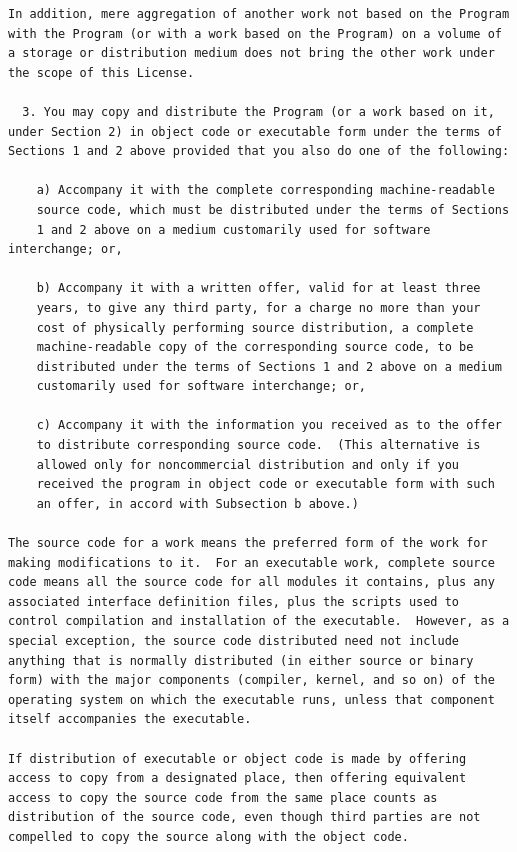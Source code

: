 \documentclass[a4paper,BCOR30mm,DIV14,pdftex,liststotoc,footsepline,openany]{scrbook}
\begin{document}
\begin{verbatim}
In addition, mere aggregation of another work not based on the Program
with the Program (or with a work based on the Program) on a volume of
a storage or distribution medium does not bring the other work under
the scope of this License.

  3. You may copy and distribute the Program (or a work based on it,
under Section 2) in object code or executable form under the terms of
Sections 1 and 2 above provided that you also do one of the following:

    a) Accompany it with the complete corresponding machine-readable
    source code, which must be distributed under the terms of Sections
    1 and 2 above on a medium customarily used for software interchange; or,

    b) Accompany it with a written offer, valid for at least three
    years, to give any third party, for a charge no more than your
    cost of physically performing source distribution, a complete
    machine-readable copy of the corresponding source code, to be
    distributed under the terms of Sections 1 and 2 above on a medium
    customarily used for software interchange; or,

    c) Accompany it with the information you received as to the offer
    to distribute corresponding source code.  (This alternative is
    allowed only for noncommercial distribution and only if you
    received the program in object code or executable form with such
    an offer, in accord with Subsection b above.)

The source code for a work means the preferred form of the work for
making modifications to it.  For an executable work, complete source
code means all the source code for all modules it contains, plus any
associated interface definition files, plus the scripts used to
control compilation and installation of the executable.  However, as a
special exception, the source code distributed need not include
anything that is normally distributed (in either source or binary
form) with the major components (compiler, kernel, and so on) of the
operating system on which the executable runs, unless that component
itself accompanies the executable.

If distribution of executable or object code is made by offering
access to copy from a designated place, then offering equivalent
access to copy the source code from the same place counts as
distribution of the source code, even though third parties are not
compelled to copy the source along with the object code.


\end{verbatim}
\end{document}
